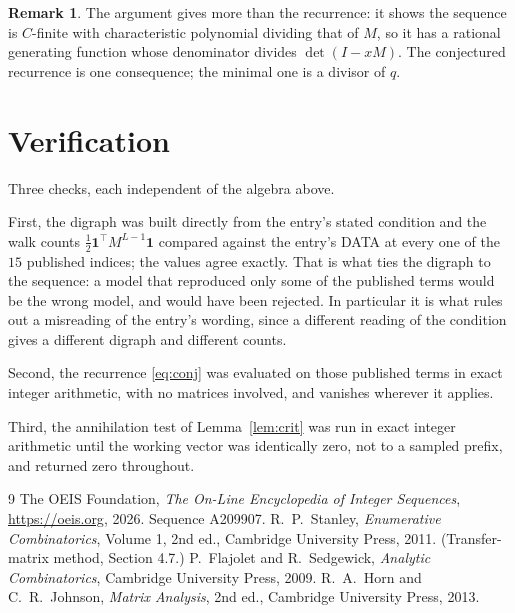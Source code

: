 \documentclass[11pt,a4paper]{article}
\theoremstyle{plain}
\theoremstyle{definition}
\newtheorem{remark}[theorem]{Remark}
\begin{document}
\begin{remark}
The argument gives more than the recurrence: it shows the sequence is $C$-finite with
characteristic polynomial dividing that of $M$, so it has a rational generating function
whose denominator divides $\det(I-xM)$. The conjectured recurrence is one consequence; the
minimal one is a divisor of $q$.
\end{remark}

\section{Verification}

Three checks, each independent of the algebra above.

First, the digraph was built directly from the entry's stated condition and the walk counts
$\tfrac1{2}\mathbf{1}^{\!\top}M^{L-1}\mathbf{1}$ compared against the entry's DATA at
every one of the $15$ published indices; the values agree exactly. That is what ties
the digraph to the sequence: a model that reproduced only some of the published terms would
be the wrong model, and would have been rejected. In particular it is what rules out a
misreading of the entry's wording, since a different reading of the condition gives a
different digraph and different counts.

Second, the recurrence \eqref{eq:conj} was evaluated on those published terms in exact
integer arithmetic, with no matrices involved, and vanishes wherever it applies.

Third, the annihilation test of Lemma~\ref{lem:crit} was run in exact integer arithmetic
until the working vector was identically zero, not to a sampled prefix, and returned zero
throughout.

\begin{thebibliography}{9}
 The OEIS Foundation, \emph{The On-Line Encyclopedia of Integer
Sequences}, \url{https://oeis.org}, 2026. Sequence A209907.
 R.~P.~Stanley, \emph{Enumerative Combinatorics}, Volume 1, 2nd ed.,
Cambridge University Press, 2011. (Transfer-matrix method, Section 4.7.)
 P.~Flajolet and R.~Sedgewick, \emph{Analytic Combinatorics}, Cambridge
University Press, 2009.
 R.~A.~Horn and C.~R.~Johnson, \emph{Matrix Analysis}, 2nd ed., Cambridge
University Press, 2013.
\end{thebibliography}
\end{document}
